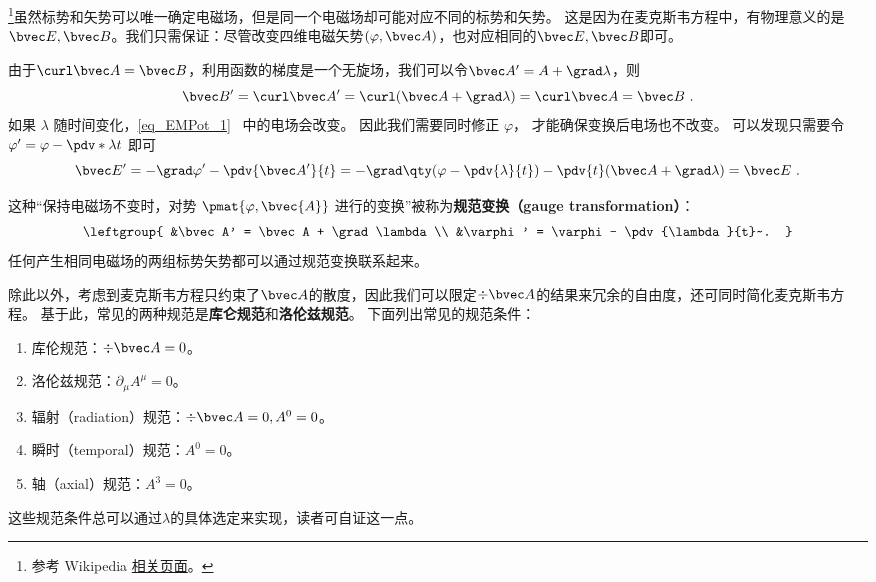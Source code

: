 
\begin{issues}
\issueDraft 
\end{issues}


\footnote{参考 Wikipedia \href{https://en.wikipedia.org/wiki/Gauge_fixing}{相关页面}。}虽然标势和矢势可以唯一确定电磁场，但是同一个电磁场却可能对应不同的标势和矢势。 这是因为在麦克斯韦方程中，有物理意义的是$\bvec E,\bvec B$。我们只需保证：尽管改变四维电磁矢势$(\varphi,\bvec A)$，也对应相同的$\bvec E,\bvec B$即可。

由于$\curl  \bvec A=\bvec B$，利用函数的梯度是一个无旋场，我们可以令$\bvec A'=A+\grad\lambda$，则
\begin{equation}
\bvec B' = \curl \bvec A' = \curl (\bvec A + \grad \lambda) = \curl \bvec A = \bvec B~.
\end{equation}
 如果 $\lambda$ 随时间变化，\autoref{eq_EMPot_1}~ 中的电场会改变。 因此我们需要同时修正 $\varphi$， 才能确保变换后电场也不改变。 可以发现只需要令 $\varphi' = \varphi - \pdv*{\lambda}{t}$ 即可
\begin{equation}
\bvec E' = -\grad \varphi' - \pdv{\bvec A'}{t} = -\grad \qty(\varphi - \pdv{\lambda}{t}) - \pdv{t} (\bvec A + \grad \lambda) = \bvec E~.
\end{equation}


这种“保持电磁场不变时，对势 $\pmat{\varphi, \bvec{A}}$ 进行的变换”被称为\textbf{规范变换（gauge transformation）}：
\begin{equation}\label{eq_Gauge_3}
\leftgroup{
&\bvec A' = \bvec A + \grad \lambda\\
&\varphi' = \varphi - \pdv{\lambda}{t}~.
}\end{equation}
任何产生相同电磁场的两组标势矢势都可以通过规范变换联系起来。

除此以外，考虑到麦克斯韦方程只约束了$\bvec A$的散度，因此我们可以限定$\div \bvec A$的结果来冗余的自由度，还可同时简化麦克斯韦方程。
基于此，常见的两种规范是\textbf{库仑规范}和\textbf{洛伦兹规范}。
下面列出常见的规范条件：
\begin{enumerate}
\item 库伦规范：$\div \bvec A=0$。
\item 洛伦兹规范：$\partial_{\mu}A^{\mu}=0$。
\item 辐射（radiation）规范：$\div \bvec A=0,A^0=0$。
\item 瞬时（temporal）规范：$A^0=0$。
\item 轴（axial）规范：$A^3=0$。
\end{enumerate}
这些规范条件总可以通过$\lambda$的具体选定来实现，读者可自证这一点。